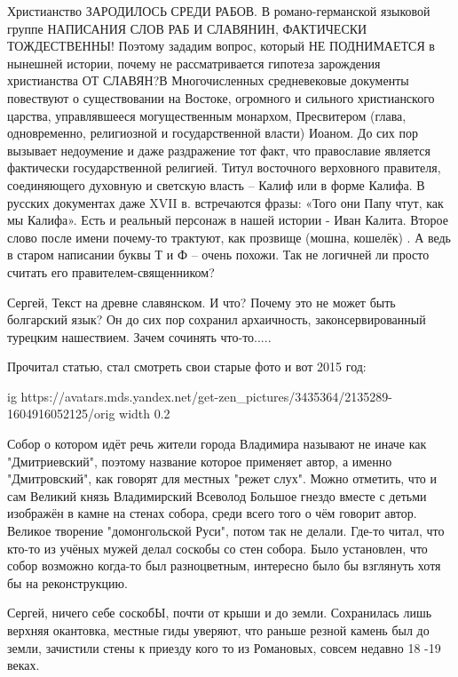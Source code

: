 \begin{itemize}
Христианство ЗАРОДИЛОСЬ СРЕДИ РАБОВ. В романо-германской языковой группе
НАПИСАНИЯ СЛОВ РАБ И СЛАВЯНИН, ФАКТИЧЕСКИ ТОЖДЕСТВЕННЫ! Поэтому зададим вопрос,
который НЕ ПОДНИМАЕТСЯ в нынешней истории, почему не рассматривается гипотеза
зарождения христианства ОТ СЛАВЯН?В Многочисленных средневековые документы
повествуют о существовании на Востоке, огромного и сильного христианского
царства, управлявшееся могущественным монархом, Пресвитером (глава,
одновременно, религиозной и государственной власти) Иоаном. До сих пор вызывает
недоумение и даже раздражение тот факт, что православие является фактически
государственной религией. Титул восточного верховного правителя, соединяющего
духовную и светскую власть – Калиф или в форме Калифа. В русских документах
даже XVII в. встречаются фразы: «Того они Папу чтут, как мы Калифа». Есть и
реальный персонаж в нашей истории - Иван Калита. Второе слово после имени
почему-то трактуют, как прозвище (мошна, кошелёк) . А ведь в старом написании
буквы Т и Ф – очень похожи. Так не логичней ли просто считать его
правителем-священником?


Сергей, Текст на древне славянском. И что? Почему это не может быть болгарский
язык? Он до сих пор сохранил архаичность, законсервированный турецким
нашествием. Зачем сочинять что-то.....


Прочитал статью, стал смотреть свои старые фото и вот 2015 год:

\ifcmt
  ig https://avatars.mds.yandex.net/get-zen_pictures/3435364/2135289-1604916052125/orig
  width 0.2
\fi


Собор о котором идёт речь жители города Владимира называют не иначе как
"Дмитриевский", поэтому название которое применяет автор, а именно
"Дмитровский", как говорят для местных "режет слух". Можно отметить, что и сам
Великий князь Владимирский Всеволод Большое гнездо вместе с детьми изображён в
камне на стенах собора, среди всего того о чём говорит автор. Великое творение
"домонгольской Руси", потом так не делали. Где-то читал, что кто-то из учёных
мужей делал соскобы со стен собора. Было установлен, что собор возможно
когда-то был разноцветным, интересно было бы взглянуть хотя бы на
реконструкцию.


Сергей, ничего себе соскобЫ, почти от крыши и до земли. Сохранилась лишь
верхняя окантовка, местные гиды уверяют, что раньше резной камень был до земли,
зачистили стены к приезду кого то из Романовых, совсем недавно 18 -19 веках.


\end{itemize}
